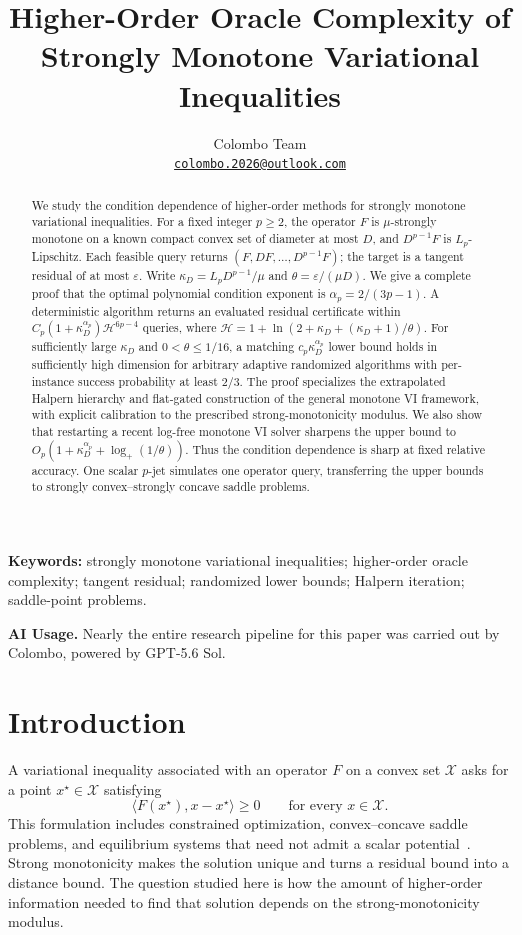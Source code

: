 \documentclass[11pt]{article}
\title{Higher-Order Oracle Complexity of\\Strongly Monotone Variational Inequalities}
\author{Colombo Team\\[0.35em]
\small\href{mailto:colombo.2026@outlook.com}{\texttt{colombo.2026@outlook.com}}}
\date{}
\numberwithin{equation}{section}
\theoremstyle{definition}
\theoremstyle{remark}
\begin{document}
\maketitle
\begin{abstract}
We study the condition dependence of higher-order methods for strongly
monotone variational inequalities. For a fixed integer $p\ge2$, the operator
$F$ is $\mu$-strongly monotone on a known compact convex set of diameter at
most $D$, and $D^{p-1}F$ is $L_p$-Lipschitz. Each feasible query returns
$(F,DF,\ldots,D^{p-1}F)$; the target is a tangent residual of at most
$\varepsilon$. Write $\kappa_D=L_pD^{p-1}/\mu$ and
$\theta=\varepsilon/(\mu D)$. We give a complete proof that the optimal
polynomial condition exponent is $\alpha_p=2/(3p-1)$. A deterministic
algorithm returns an evaluated residual certificate within
$C_p(1+\kappa_D^{\alpha_p})\mathcal H^{6p-4}$ queries, where
$\mathcal H=1+\ln(2+\kappa_D+(\kappa_D+1)/\theta)$.
For sufficiently large $\kappa_D$ and $0<\theta\le1/16$, a matching
$c_p\kappa_D^{\alpha_p}$ lower bound holds in sufficiently high dimension
for arbitrary adaptive randomized algorithms with per-instance success
probability at least $2/3$. The proof specializes the extrapolated Halpern
hierarchy and flat-gated construction of the general monotone VI framework,
with explicit calibration to the prescribed strong-monotonicity modulus.
We also show that restarting a recent log-free monotone VI solver
sharpens the upper bound to
$O_p(1+\kappa_D^{\alpha_p}+\log_{+}(1/\theta))$.
Thus the condition dependence is sharp at fixed relative accuracy. One
scalar $p$-jet simulates one operator query, transferring the upper bounds
to strongly convex--strongly concave saddle problems.
\end{abstract}
\noindent\textbf{Keywords:} strongly monotone variational inequalities;
higher-order oracle complexity; tangent residual; randomized lower bounds;
Halpern iteration; saddle-point problems.
\par
\begin{samepage}
\noindent\textbf{AI Usage.}
Nearly the entire research pipeline for this paper was carried out by
Colombo, powered by GPT-5.6 Sol. 
\par
\end{samepage}

\section{Introduction}\label{sec:intro}
A variational inequality associated with an operator $F$ on a convex set
$\mathcal X$ asks for a point $x^\star\in\mathcal X$ satisfying
\[
\langle F(x^\star),x-x^\star\rangle\ge0
\qquad\text{for every }x\in\mathcal X.
\]
This formulation includes constrained optimization, convex--concave saddle
problems, and equilibrium systems that need not admit a scalar
potential~\cite{facchinei2003}. Strong monotonicity makes the solution
unique and turns a residual bound into a distance bound. The question
studied here is how the amount of higher-order information needed to find
that solution depends on the strong-monotonicity modulus.
\end{document}
